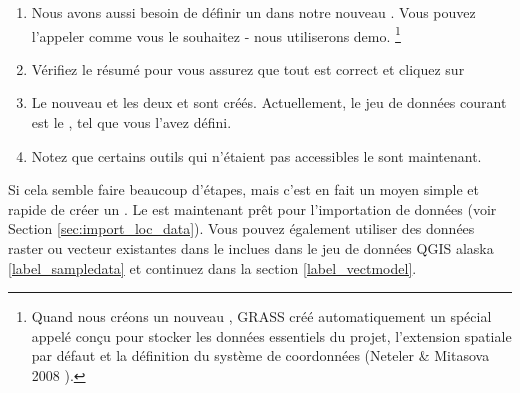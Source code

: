 \begin{enumerate}
  \item Nous avons aussi besoin de d\'efinir un  dans notre nouveau . Vous pouvez l'appeler comme vous le souhaitez - nous utiliserons demo. \footnote{Quand nous cr\'eons un nouveau , GRASS cr\'e\'e automatiquement un  sp\'ecial appel\'e  con\c{c}u pour stocker les donn\'ees essentiels du projet, l'extension spatiale par d\'efaut et la d\'efinition du syst\`eme de coordonn\'ees (Neteler \& Mitasova 2008  \cite{neteler_mitasova08}).}
  \item V\'erifiez le r\'esum\'e pour vous assurez que tout est correct et cliquez sur  
  \item Le nouveau  et les deux  et  sont cr\'e\'es. Actuellement, le jeu de donn\'ees courant est le , tel que vous l'avez d\'efini.
  \item Notez que certains outils qui n'\'etaient pas accessibles le sont maintenant.
\end{enumerate}


Si cela semble faire beaucoup d'\'etapes, mais c'est en fait un moyen simple et rapide de cr\'eer un . Le  est maintenant pr\^et pour l'importation de donn\'ees (voir Section \ref{sec:import_loc_data}). Vous pouvez \'egalement utiliser des donn\'ees raster ou vecteur existantes dans le  inclues dans le jeu de donn\'ees QGIS alaska \ref{label_sampledata} et continuez dans la section \ref{label_vectmodel}.

